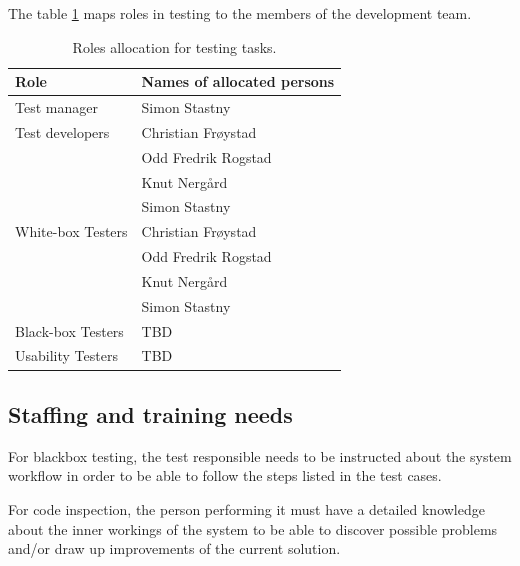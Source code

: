 \documentclass[11pt]{book}
\begin{document}
The table \ref{tab:test_plan_roles_allocation} maps roles in testing to the members of the development team.

\begin{table}[H]
    \centering
    \begin{tabular}{| l | l |}
        \hline
        Role                & Names of allocated persons    \\ \hline

        Test manager        & Simon Stastny                 \\ \hline

        Test developers     & Christian Frøystad            \\
                            & Odd Fredrik Rogstad           \\
                            & Knut Nergård                  \\
                            & Simon Stastny                 \\ \hline

        White-box Testers   & Christian Frøystad            \\
                            & Odd Fredrik Rogstad           \\
                            & Knut Nergård                  \\
                            & Simon Stastny                 \\ \hline

        Black-box Testers   & TBD                           \\ \hline %

        Usability Testers   & TBD                           \\ \hline %
    \end{tabular}
    \label{tab:test_plan_roles_allocation}
    \caption{Roles allocation for testing tasks.}
\end{table}

\subsection{Staffing and training needs}
For blackbox testing, the test responsible needs to be instructed about the system workflow in order to be able to follow the steps listed in the test cases.

For code inspection, the person performing it must have a detailed knowledge about the inner workings of the system to be able to discover possible problems and/or draw up improvements of the current solution.
\end{document}

